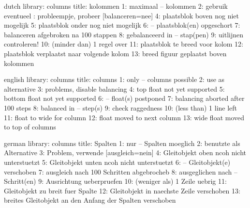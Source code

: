 

\unprotect


\startmessages  dutch  library: columns 
  title: kolommen
      1: maximaal -- kolommen
      2: gebruik eventueel \string{}: probleempje, probeer [balanceren=nee]
      4: plaatsblok boven nog niet mogelijk
      5: plaatsblok onder nog niet mogelijk
      6: -- plaatsblok(en) opgeschort
      7: balanceren afgebroken na 100 stappen
      8: gebalanceerd in -- stap(pen)
      9: uitlijnen controleren!
     10: (minder dan) 1 regel over
     11: plaatsblok te breed voor kolom
     12: plaatsblok verplaatst naar volgende kolom
     13: breed figuur geplaatst boven kolommen
\stopmessages

\startmessages  english  library: columns
  title: columns
      1: only -- columns possible
      2: use \string\filbreak\space as alternative
      3: problems, disable balancing 
      4: top float not yet supported 
      5: bottom float not yet supported 
      6: -- float(s) postponed
      7: balancing aborted after 100 steps 
      8: balanced in -- step(s)
      9: check raggedness 
     10: (less than) 1 line left 
     11: float to wide for column 
     12: float moved to next column 
     13: wide float moved to top of columns
\stopmessages

\startmessages  german  library: columns
  title: Spalten
      1: nur -- Spalten moeglich
      2: benutzte \string\filbreak\space als Alternative
      3: Problem, verwende [ausgleich=nein]
      4: Gleitobjekt oben ncoh nicht unterstuetzt
      5: Gleitobjekt unten ncoh nicht unterstuetzt
      6: -- Gleitobjekt(e) verschoben
      7: ausgleich nach 100 Schritten abgebrocheb 
      8: ausgeglichen nach  -- Schritt(en)
      9: Ausrichtung ueberpruefen
     10: (weniger als) 1 Zeile uebrig
     11: Gleitobjekt zu breit fuer Spalte 
     12: Gleitobjekt in naechste Zeile verschoben 
     13: breites Gleitobjekt an den Anfang der Spalten verschoben
\stopmessages

